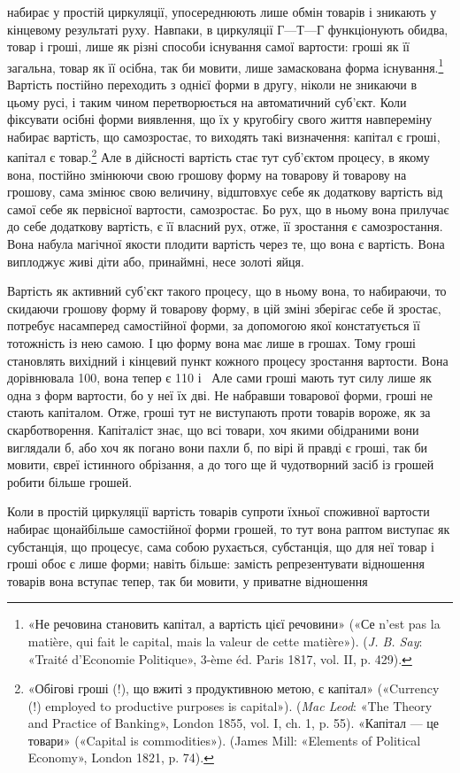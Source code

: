 \parcont{}  %
набирає у простій циркуляції, упосереднюють лише обмін товарів
і зникають у кінцевому результаті руху. Навпаки, в циркуляції
$Г — Т — Г$ функціонують обидва, товар і гроші, лише як різні
способи існування самої вартости: гроші як її загальна, товар
як її осібна, так би мовити, лише замаскована форма існування.\footnote{
«Не речовина становить капітал, а вартість цієї речовини» («Се
n’est pas la matière, qui fait le capital, mais la valeur de cette matière»).
(\emph{J. B. Say}: «Traité d’Economie Politique», 3-ème éd. Paris 1817, vol. II,
p. 429).
}
Вартість постійно переходить з однієї форми в другу, ніколи не
зникаючи в цьому русі, і таким чином перетворюється на автоматичний
суб’єкт. Коли фіксувати осібні форми виявлення, що
їх у кругобігу свого життя навпереміну набирає вартість, що
самозростає, то виходять такі визначення: капітал є гроші, капітал
є товар.\footnote{
«Обігові гроші (!), що вжиті з продуктивною метою, є капітал»
(«Currency (!) employed to productive purposes is capital»). (\emph{Mac Leod}:
«The Theory and Practice of Banking», London 1855, vol. I, ch. 1, p. 55).
«Капітал — це товари» («Capital is commodities»). (James Mill: «Elements
of Political Economy», London 1821, p. 74).
} Але в дійсності вартість стає тут суб’єктом процесу,
в якому вона, постійно змінюючи свою грошову форму на товарову
й товарову на грошову, сама змінює свою величину, відштовхує
себе як додаткову вартість від самої себе як первісної
вартости, самозростає. Бо рух, що в ньому вона прилучає до себе
додаткову вартість, є її власний рух, отже, її зростання є самозростання.
Вона набула магічної якости плодити вартість через
те, що вона є вартість. Вона виплоджує живі діти або, принаймні,
несе золоті яйця.

Вартість як активний суб’єкт такого процесу, що в ньому
вона, то набираючи, то скидаючи грошову форму й товарову
форму, в цій зміні зберігає себе й зростає, потребує насамперед
самостійної форми, за допомогою якої констатується її тотожність
із нею самою. І цю форму вона має лише в грошах. Тому гроші
становлять вихідний і кінцевий пункт кожного процесу зростання
вартости. Вона дорівнювала 100, вона тепер
є 110 і~ Але сами гроші мають тут силу
лише як одна з форм вартости, бо у неї їх дві. Не набравши товарової
форми, гроші не стають капіталом. Отже, гроші тут не виступають
проти товарів вороже, як за скарботворення. Капіталіст
знає, що всі товари, хоч якими обідраними вони виглядали б,
або хоч як погано вони пахли б, по вірі й правді є гроші, так би
мовити, євреї істинного обрізання, а до того ще й чудотворний
засіб із грошей робити більше грошей.

Коли в простій циркуляції вартість товарів супроти їхньої
споживної вартости набирає щонайбільше самостійної форми
грошей, то тут вона раптом виступає як субстанція, що процесує,
сама собою рухається, субстанція, що для неї товар і гроші обоє
є лише форми; навіть більше: замість репрезентувати відношення
товарів вона вступає тепер, так би мовити, у приватне відношення
\parbreak{}  %
